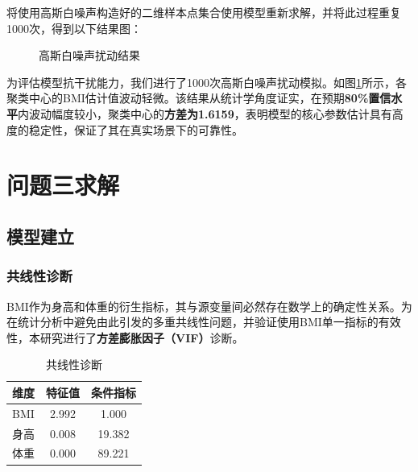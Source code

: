 \documentclass[12pt]{ctexart}
\begin{document}
	将使用高斯白噪声构造好的二维样本点集合使用模型重新求解，并将此过程重复1000次，得到以下结果图：
	\begin{figure}[H]
		\centering
		\caption{高斯白噪声扰动结果}
		\label{q2e}
	\end{figure}
	
	为评估模型抗干扰能力，我们进行了1000次高斯白噪声扰动模拟。如图\ref{q2e}所示，各聚类中心的BMI估计值波动轻微。该结果从统计学角度证实，在预期\textbf{80\%置信水平}内波动幅度较小，聚类中心的\textbf{方差为1.6159}，表明模型的核心参数估计具有高度的稳定性，保证了其在真实场景下的可靠性。
	
	\section{问题三求解}

	\subsection{模型建立}
	\subsubsection{共线性诊断}
	BMI作为身高和体重的衍生指标，其与源变量间必然存在数学上的确定性关系。为在统计分析中避免由此引发的多重共线性问题，并验证使用BMI单一指标的有效性，本研究进行了\textbf{方差膨胀因子（VIF）}诊断。
	\begin{table}[htbp]
		\centering
				\caption{共线性诊断}
		\setlength{\tabcolsep}{23pt} %
		\begin{tabular}{ccc}
			\toprule
			维度 & 特征值 & 条件指标 \\
			\midrule
			BMI & 2.992 & 1.000 \\
			身高 & 0.008 & 19.382 \\
			体重 & 0.000 & 89.221 \\
			\bottomrule
		\end{tabular}
	\end{table}
	
\end{document}
